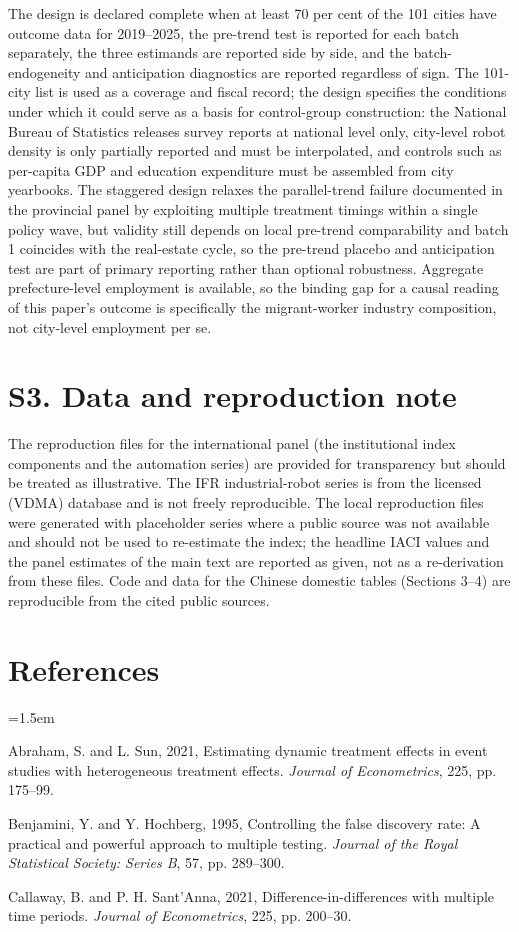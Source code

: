 \documentclass[12pt]{article}
\begin{document}
The design is declared complete when at least 70 per cent of the 101 cities have outcome data for 2019--2025, the pre-trend test is reported for each batch separately, the three estimands are reported side by side, and the batch-endogeneity and anticipation diagnostics are reported regardless of sign. The 101-city list is used as a coverage and fiscal record; the design specifies the conditions under which it could serve as a basis for control-group construction: the National Bureau of Statistics releases survey reports at national level only, city-level robot density is only partially reported and must be interpolated, and controls such as per-capita GDP and education expenditure must be assembled from city yearbooks. The staggered design relaxes the parallel-trend failure documented in the provincial panel by exploiting multiple treatment timings within a single policy wave, but validity still depends on local pre-trend comparability and batch 1 coincides with the real-estate cycle, so the pre-trend placebo and anticipation test are part of primary reporting rather than optional robustness. Aggregate prefecture-level employment is available, so the binding gap for a causal reading of this paper's outcome is specifically the migrant-worker industry composition, not city-level employment per se.

\section*{S3. Data and reproduction note}

The reproduction files for the international panel (the institutional index components and the automation series) are provided for transparency but should be treated as illustrative. The IFR industrial-robot series is from the licensed (VDMA) database and is not freely reproducible. The local reproduction files were generated with placeholder series where a public source was not available and should not be used to re-estimate the index; the headline IACI values and the panel estimates of the main text are reported as given, not as a re-derivation from these files. Code and data for the Chinese domestic tables (Sections 3--4) are reproducible from the cited public sources.

\section*{References}
\begin{list}{}{\leftmargin=1.5em}
\item Abraham, S. and L. Sun, 2021, Estimating dynamic treatment effects in event studies with heterogeneous treatment effects. \emph{Journal of Econometrics}, 225, pp. 175--99.
\item Benjamini, Y. and Y. Hochberg, 1995, Controlling the false discovery rate: A practical and powerful approach to multiple testing. \emph{Journal of the Royal Statistical Society: Series B}, 57, pp. 289--300.
\item Callaway, B. and P. H. Sant'Anna, 2021, Difference-in-differences with multiple time periods. \emph{Journal of Econometrics}, 225, pp. 200--30.
\end{list}
\end{document}
